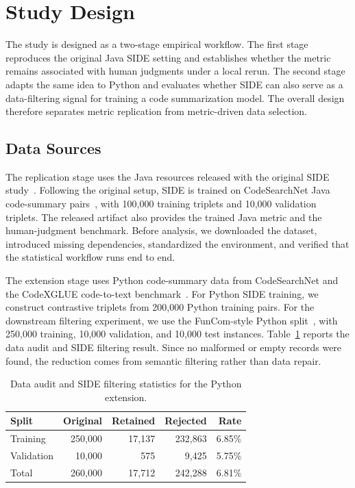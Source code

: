 \section{Study Design}

The study is designed as a two-stage empirical workflow. The first stage reproduces the original Java SIDE setting and establishes whether the metric remains associated with human judgments under a local rerun. The second stage adapts the same idea to Python and evaluates whether SIDE can also serve as a data-filtering signal for training a code summarization model. The overall design therefore separates metric replication from metric-driven data selection.

\subsection{Data Sources}

The replication stage uses the Java resources released with the original SIDE study~\cite{mastropaolo2024evaluating}. Following the original setup, SIDE is trained on CodeSearchNet Java code-summary pairs~\cite{husain2019codesearchnet}, with 100{,}000 training triplets and 10{,}000 validation triplets. The released artifact also provides the trained Java metric and the human-judgment benchmark. Before analysis, we downloaded the dataset, introduced missing dependencies, standardized the environment, and verified that the statistical workflow runs end to end.

The extension stage uses Python code-summary data from CodeSearchNet and the CodeXGLUE code-to-text benchmark~\cite{husain2019codesearchnet,lu2021codexglue,yin2018mining}. For Python SIDE training, we construct contrastive triplets from 200{,}000 Python training pairs. For the downstream filtering experiment, we use the FunCom-style Python split~\cite{leclair2019recommendations,leclair2019neural}, with 250{,}000 training, 10{,}000 validation, and 10{,}000 test instances. Table~\ref{tab:data_filtering_audit} reports the data audit and SIDE filtering result. Since no malformed or empty records were found, the reduction comes from semantic filtering rather than data repair.

\begin{table}[t]
\centering
\caption{Data audit and SIDE filtering statistics for the Python extension.}
\label{tab:data_filtering_audit}
\small
\begin{tabular}{lrrrr}
\hline
\textbf{Split} & \textbf{Original} & \textbf{Retained} & \textbf{Rejected} & \textbf{Rate} \\
\hline
Training & 250,000 & 17,137 & 232,863 & 6.85\% \\
Validation & 10,000 & 575 & 9,425 & 5.75\% \\
\hline
Total & 260,000 & 17,712 & 242,288 & 6.81\% \\
\hline
\end{tabular}
\end{table}

